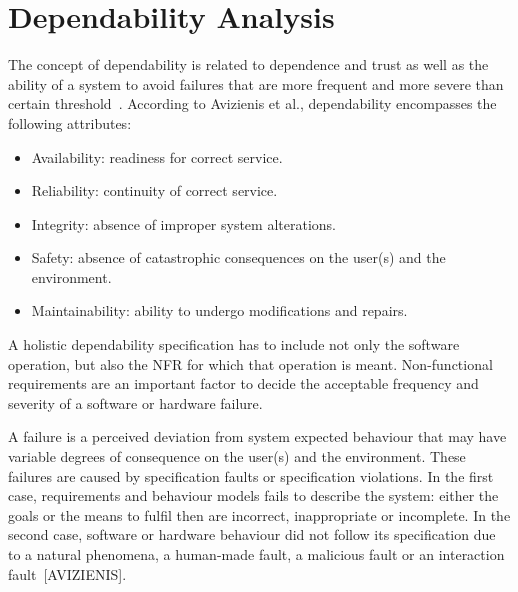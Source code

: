 
\section{Dependability Analysis}

The concept of dependability is related to dependence and trust as well as the ability of a system to avoid failures that are more frequent and more severe than certain threshold~\cite{Laprie2004}. According to Avizienis et al., dependability encompasses the following attributes: 

\begin{itemize}

\item Availability: readiness for correct service.
\medskip

\item Reliability: continuity of correct service.
\medskip

\item Integrity: absence of improper system alterations.
\medskip

\item Safety: absence of catastrophic consequences on the user(s) and the environment.
\medskip

\item Maintainability: ability to undergo modifications and repairs.
\medskip

\end{itemize}


A holistic dependability specification has to include not only the software operation, but also the NFR for which that operation is meant. Non-functional requirements are an important factor to decide the acceptable frequency and severity of a software or hardware failure.

A failure is a perceived deviation from system expected behaviour that may have variable degrees of consequence on the user(s) and the environment. These failures are caused by specification faults or specification violations. In the first case, requirements and behaviour models fails to describe the system: either the goals or the means to fulfil then are incorrect, inappropriate or incomplete. In the second case, software or hardware behaviour did not follow its specification due to a natural phenomena, a human-made fault, a malicious fault or an interaction fault~[AVIZIENIS].

